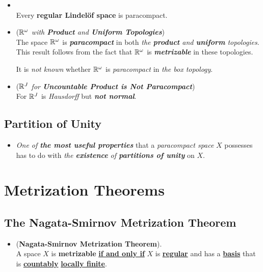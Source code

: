 \documentclass[11pt]{article}
\begin{document}
\begin{itemize}
\item \begin{proposition} \citep{munkres2000topology}\\
Every \textbf{regular Lindel\"of space} is paracompact.
\end{proposition}

\item \begin{example} (\emph{${\mathbb R}^{\omega}$ with \textbf{Product} and \textbf{Uniform Topologies}})\\
The space ${\mathbb R}^{\omega}$ is \emph{\textbf{paracompact}} in both \emph{the \textbf{product} and \textbf{uniform} topologies}.
This result follows from the fact that ${\mathbb R}^{\omega}$ is \emph{\textbf{metrizable}} in these topologies. 

It is \emph{not known} whether ${\mathbb R}^{\omega}$  is \emph{paracompact} in \emph{the box topology}.
\end{example}

\item \begin{example} (\emph{${\mathbb R}^{J}$ for \textbf{Uncountable Product is Not Paracompact}})\\
For ${\mathbb R}^{J}$ is \emph{Hausdorff} but \emph{\textbf{not normal}}.
\end{example}

\end{itemize}

\subsection{Partition of Unity}
\begin{itemize}
\item \begin{remark}
\emph{One of \textbf{the most useful properties}} that a \emph{paracompact space} $X$ possesses has to do with \emph{the \textbf{existence} of \textbf{partitions of unity}} on $X$.
\end{remark}
\end{itemize}

\section{Metrization Theorems}
\subsection{The Nagata-Smirnov Metrization Theorem}
\begin{itemize}
\item \begin{theorem} (\textbf{Nagata-Smirnov Metrization Theorem}). \citep{munkres2000topology} \\
A space $X$ is \textbf{metrizable} \underline{\textbf{if and only if}} $X$ is \underline{\textbf{regular}} and has a \underline{\textbf{basis}} that is \underline{\textbf{countably}} \underline{\textbf{locally finite}}.
\end{theorem}
\end{itemize}
\end{document}
